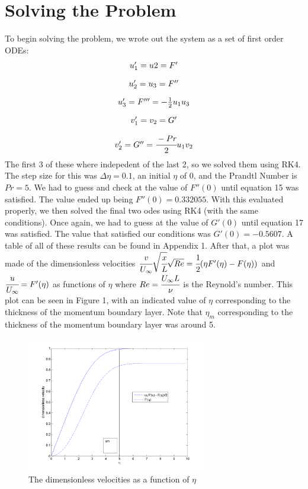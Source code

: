 \documentclass{article}
\begin{document}
\section*{Solving the Problem}
To begin solving the problem, we wrote out the system as a set of first order ODEs:
\[\begin{array}{c}u_1'=u2=F'\\[1em]u_2'=u_3=F''\\[1em]u_3'=F'''=-\frac{1}{2}u_1u_3\\[1em]v_1'=v_2=G'\\[1em]v_2'=G''=\cfrac{-Pr}{2}u_1v_2\end{array}\]
The first 3 of these where indepedent of the last 2, so we solved them using RK4. The step size for this was $\Delta \eta=0.1$, an initial $\eta$ of 0, and the Prandtl Number is $Pr=5$. We had to guess and check at the value of $F''(0)$ until equation 15 was satisfied. The value ended up being $F''(0)=0.332055$. With this evaluated properly, we then solved the final two odes using RK4 (with the same conditions). Once again, we had to guess at the value of $G'(0)$ until equation 17 was satisfied.
The value that satisfied our conditions was $G'(0)=-0.5607$. A table of all of these results can be found in Appendix 1. After that, a plot was made of the dimensionless velocities $\cfrac{v}{U_\infty}\sqrt{\cfrac{x}{L}}\sqrt{Re}=\cfrac{1}{2}(\eta F'(\eta)-F(\eta))$ and $\cfrac{u}{U_\infty}=F'(\eta)$ as functions of $\eta$ where $Re=\cfrac{U_\infty L}{\nu}$ is the Reynold's number. This plot can be seen in Figure 1, with an indicated value of $\eta$ corresponding to the thickness of the
momentum boundary layer. Note that $\eta_m$ corresponding to the thickness of the momentum boundary layer was around 5.
\begin{figure}[H]
    \centering
    \includegraphics[width=0.7\textwidth]{velocities.png}
    \caption{The dimensionless velocities as a function of $\eta$}
\end{figure}
\end{document}
